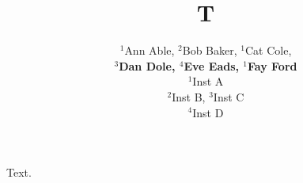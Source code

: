 \documentclass{article}
\begin{document}
\title{T}
\author{$^1$Ann Able, $^2$Bob Baker, $^1$Cat Cole, \\
\textbf{$^3$Dan Dole, $^4$Eve Eads, $^1$Fay Ford}\\
$^1$Inst A \\ $^2$Inst B, $^3$Inst C \\ $^4$Inst D}
\maketitle
Text.
\end{document}
